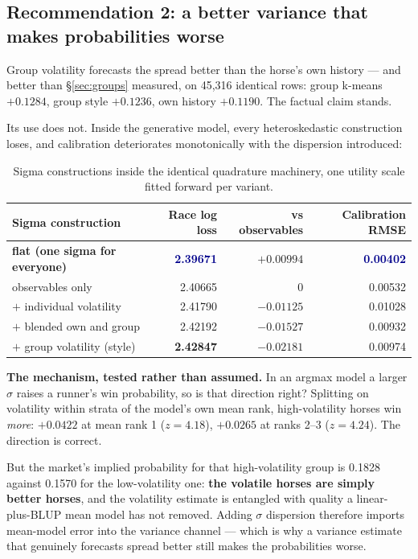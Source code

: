 \documentclass[11pt,a4paper]{article}
\newcommand{\good}[1]{\textcolor{darkblue}{\textbf{#1}}}
\newcommand{\bad}[1]{\textcolor{warm}{\textbf{#1}}}
\begin{document}
\subsection{Recommendation 2: a better variance that makes probabilities worse}

Group volatility forecasts the spread better than the horse's own history --- and
better than \S\ref{sec:groups} measured, on 45{,}316 identical rows: group k-means
$+0.1284$, group style $+0.1236$, own history $+0.1190$. The factual claim stands.

Its use does not. Inside the generative model, every heteroskedastic construction
loses, and calibration deteriorates monotonically with the dispersion introduced:

\begin{table}[htbp]\centering\small
\caption{Sigma constructions inside the identical quadrature machinery, one utility
scale fitted forward per variant.}
\begin{tabular}{lrrr}
\toprule
Sigma construction & Race log loss & vs observables & Calibration RMSE\\
\midrule
\textbf{flat (one sigma for everyone)} & \good{2.39671} & $+0.00994$ & \good{0.00402}\\
observables only & 2.40665 & 0 & 0.00532\\
$+$ individual volatility & 2.41790 & $-0.01125$ & 0.01028\\
$+$ blended own and group & 2.42192 & $-0.01527$ & 0.00932\\
$+$ group volatility (style) & \bad{2.42847} & \bad{$-0.02181$} & 0.00974\\
\bottomrule
\end{tabular}
\end{table}

\textbf{The mechanism, tested rather than assumed.} In an argmax model a larger
$\sigma$ raises a runner's win probability, so is that direction right? Splitting on
volatility within strata of the model's own mean rank, high-volatility horses win
\emph{more}: $+0.0422$ at mean rank 1 ($z=4.18$), $+0.0265$ at ranks 2--3
($z=4.24$). The direction is correct.

But the market's implied probability for that high-volatility group is 0.1828
against 0.1570 for the low-volatility one: \textbf{the volatile horses are simply
better horses}, and the volatility estimate is entangled with quality a
linear-plus-BLUP mean model has not removed. Adding $\sigma$ dispersion therefore
imports mean-model error into the variance channel --- which is why a variance
estimate that genuinely forecasts spread better still makes the probabilities worse.
\end{document}
